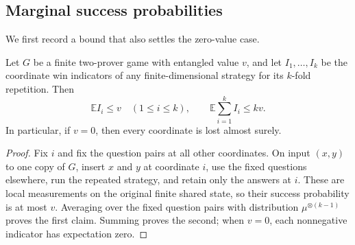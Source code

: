 \subsection{Marginal success probabilities}
\label{subsec:marginal-success}

We first record a bound that also settles the zero-value case.
\begin{lemma}\label{lem:mean-bound}
Let $G$ be a finite two-prover game with entangled value $v$, and let
$I_1,\ldots,I_k$ be the coordinate win indicators of any finite-dimensional
strategy for its $k$-fold repetition. Then
\[
  \mathbb E I_i\le v\quad(1\le i\le k),
  \qquad \mathbb E\sum_{i=1}^k I_i\le kv.
\]
In particular, if $v=0$, then every coordinate is lost almost surely.
\end{lemma}
\begin{proof}
Fix $i$ and fix the question pairs at all other coordinates. On input
$(x,y)$ to one copy of $G$, insert $x$ and $y$ at coordinate $i$, use the
fixed questions elsewhere, run the repeated strategy, and retain only the
answers at $i$. These are local measurements on the original finite shared
state, so their success probability is at most $v$. Averaging over the
fixed question pairs with distribution $\mu^{\otimes(k-1)}$ proves the first
claim. Summing proves the second; when $v=0$, each nonnegative indicator
has expectation zero.
\end{proof}

